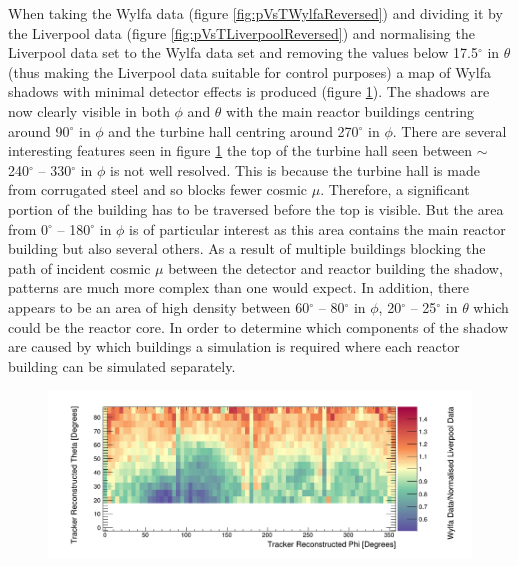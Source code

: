 When taking the Wylfa data (figure \ref{fig:pVsTWylfaReversed}) and dividing it by the Liverpool data (figure \ref{fig:pVsTLiverpoolReversed}) and normalising the Liverpool data set to the Wylfa data set and removing the values below 17.5$^\circ$ in $\theta$ (thus making the Liverpool data suitable for control purposes) a map of Wylfa shadows with minimal detector effects is produced (figure \ref{fig:measuredTrackerReconNoLines}). The shadows are now clearly visible in both $\phi$ and $\theta$ with the main reactor buildings centring around 90$^\circ$ in $\phi$ and the turbine hall centring around 270$^\circ$ in $\phi$. There are several interesting features seen in figure \ref{fig:measuredTrackerReconNoLines} the top of the turbine hall seen between $\sim$ 240$^\circ$ -- 330$^\circ$ in $\phi$ is not well resolved. This is because the turbine hall is made from corrugated steel and so blocks fewer cosmic $\mu$. Therefore, a significant portion of the building has to be traversed before the top is visible. But the area from 0$^\circ$ -- 180$^\circ$ in $\phi$ is of particular interest as this area contains the main reactor building but also several others. As a result of multiple buildings blocking the path of incident cosmic $\mu$ between the detector and reactor building the shadow, patterns are much more complex than one would expect. In addition, there appears to be an area of high density between 60$^\circ$ -- 80$^\circ$ in $\phi$, 20$^\circ$ -- 25$^\circ$ in $\theta$ which could be the reactor core. In order to determine which components of the shadow are caused by which buildings a simulation is required where each reactor building can be simulated separately.

\begin{figure}[!h]
 \centering
 \includegraphics[width=\linewidth]{Chapter5/Figs/wylfaRasterNew/measuredTrackerReconNoLines.png}
 \label{fig:measuredTrackerReconNoLines}
\end{figure}

